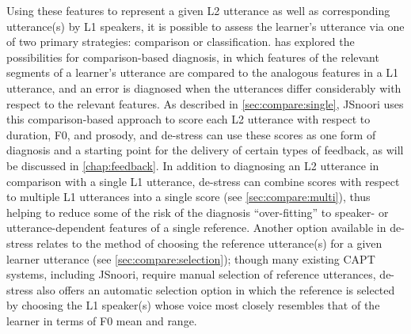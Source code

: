	Using these features to represent a given L2 utterance as well as corresponding utterance(s) by L1 speakers, it is possible to assess the learner's utterance via one of two primary strategies: comparison or classification.  has explored the possibilities for comparison-based diagnosis, in which features of the relevant segments of a learner's utterance are compared to the analogous features in a L1 utterance, and an error is diagnosed when the utterances differ considerably with respect to the relevant features. As described in \cref{sec:compare:single}, JSnoori uses this comparison-based approach to score each L2 utterance with respect to duration, F0, and prosody, and de-stress can use these scores as one form of diagnosis and a starting point for the delivery of certain types of feedback, as will be discussed in \cref{chap:feedback}. In addition to diagnosing an L2 utterance in comparison with a single L1 utterance, de-stress can combine scores with respect to multiple L1 utterances into a single score (see \cref{sec:compare:multi}), thus helping to reduce some of the risk of the diagnosis ``over-fitting'' to speaker- or utterance-dependent features of a single reference. Another option available in de-stress relates to the method of choosing the reference utterance(s) for a given learner utterance (see \cref{sec:compare:selection}); though many existing CAPT systems, including JSnoori, require manual selection of reference utterances, de-stress also offers an automatic selection option in which the reference is selected by choosing the L1 speaker(s) whose voice most closely resembles that of the learner in terms of F0 mean and range. 
	
